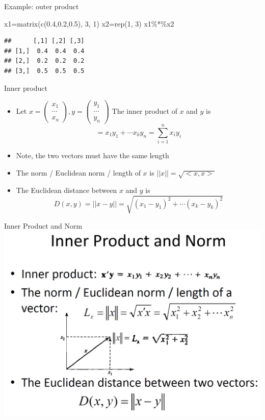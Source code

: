 \documentclass[
  ignorenonframetext,
]{beamer}
\newenvironment{Shaded}{\begin{snugshade}}{\end{snugshade}}
\newcommand{\DecValTok}[1]{\textcolor[rgb]{0.00,0.00,0.81}{#1}}
\newcommand{\FloatTok}[1]{\textcolor[rgb]{0.00,0.00,0.81}{#1}}
\newcommand{\FunctionTok}[1]{\textcolor[rgb]{0.00,0.00,0.00}{#1}}
\newcommand{\NormalTok}[1]{#1}
\newcommand{\OtherTok}[1]{\textcolor[rgb]{0.56,0.35,0.01}{#1}}
\newcommand{\SpecialCharTok}[1]{\textcolor[rgb]{0.00,0.00,0.00}{#1}}
\providecommand{\tightlist}{%
  \setlength{\itemsep}{0pt}\setlength{\parskip}{0pt}}
\begin{document}
\begin{frame}[fragile]{Example: outer product}
\protect\hypertarget{example-outer-product}{}
\begin{Shaded}
\begin{Highlighting}[]
\NormalTok{x1}\OtherTok{=}\FunctionTok{matrix}\NormalTok{(}\FunctionTok{c}\NormalTok{(}\FloatTok{0.4}\NormalTok{,}\FloatTok{0.2}\NormalTok{,}\FloatTok{0.5}\NormalTok{), }\DecValTok{3}\NormalTok{, }\DecValTok{1}\NormalTok{)}
\NormalTok{x2}\OtherTok{=}\FunctionTok{rep}\NormalTok{(}\DecValTok{1}\NormalTok{, }\DecValTok{3}\NormalTok{)}
\NormalTok{x1}\SpecialCharTok{\%*\%}\NormalTok{x2}
\end{Highlighting}
\end{Shaded}

\begin{verbatim}
##      [,1] [,2] [,3]
## [1,]  0.4  0.4  0.4
## [2,]  0.2  0.2  0.2
## [3,]  0.5  0.5  0.5
\end{verbatim}
\end{frame}

\begin{frame}{Inner product}
\protect\hypertarget{inner-product}{}
\begin{itemize}
\tightlist
\item
  Let
  \(x=\begin{pmatrix}x_1\\ \cdots\\ x_n\end{pmatrix}, y=\begin{pmatrix}y_1\\ \cdots\\ y_n\end{pmatrix}\)
  The inner product of \(x\) and \(y\) is
  \[<x,y>=x_1y_1 + \cdots x_ky_n=\sum_{i=1}^n x_iy_i\]
\item
  Note, the two vectors must have the same length
\item
  The norm / Euclidean norm / length of \(x\) is \(||x||=\sqrt{<x,x>}\)
\item
  The Euclidean distance between \(x\) and \(y\) is
  \[D(x,y)=||x-y||=\sqrt{(x_1-y_1)^2 + \cdots (x_k-y_k)^2}\]
\end{itemize}
\end{frame}

\begin{frame}{Inner Product and Norm}
\protect\hypertarget{inner-product-and-norm}{}
\includegraphics[width=0.7\linewidth]{img/InnerProdNorm}
\end{frame}
\end{document}
